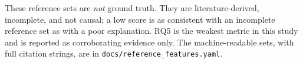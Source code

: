 \begin{table}[t]
\centering
\caption{RQ5 --- pre-registered plausibility reference sets and top-5 overlap.}
\label{tab:plausibility}
\small
{}
\par\vspace{2pt}\footnotesize These reference sets are \emph{not} ground truth. They are literature-derived, incomplete, and not causal; a low score is as consistent with an incomplete reference set as with a poor explanation. RQ5 is the weakest metric in this study and is reported as corroborating evidence only. The machine-readable sets, with full citation strings, are in \texttt{docs/reference\_features.yaml}.
\end{table}
